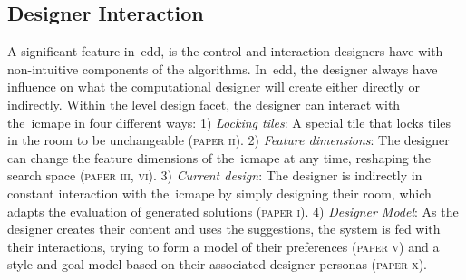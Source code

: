 






\subsection{Designer Interaction}
\label{sec:desInteraction}

A significant feature in~\acrshort{edd}, is the control and interaction designers have with non-intuitive components of the algorithms. In~\acrshort{edd}, the designer always have influence on what the computational designer will create either directly or indirectly. Within the level design facet, the designer can interact with the~\acrshort{icmape} in four different ways: 1) \emph{Locking tiles}: A special tile that locks tiles in the room to be unchangeable (\textsc{paper ii}). 2) \emph{Feature dimensions}: The designer can change the feature dimensions of the~\acrshort{icmape} at any time, reshaping the search space (\textsc{paper iii, vi}). 3) \emph{Current design}: The designer is indirectly in constant interaction with the~\acrshort{icmape} by simply designing their room, which adapts the evaluation of generated solutions (\textsc{paper i}). 4) \emph{Designer Model}: As the designer creates their content and uses the suggestions, the system is fed with their interactions, trying to form a model of their preferences (\textsc{paper v}) and a style and goal model based on their associated designer personas (\textsc{paper x}).

